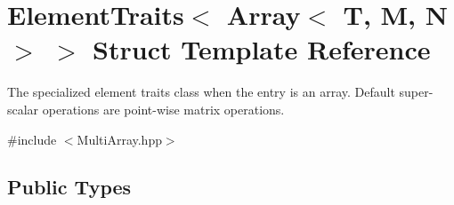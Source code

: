 \hypertarget{struct_d_o_1_1_element_traits_3_01_array_3_01_t_00_01_m_00_01_n_01_4_01_4}{\section{Element\-Traits$<$ Array$<$ T, M, N $>$ $>$ Struct Template Reference}
\label{struct_d_o_1_1_element_traits_3_01_array_3_01_t_00_01_m_00_01_n_01_4_01_4}
}


The specialized element traits class when the entry is an array. Default super-\/scalar operations are point-\/wise matrix operations.  




{\ttfamily \#include $<$Multi\-Array.\-hpp$>$}

\subsection*{Public Types}
